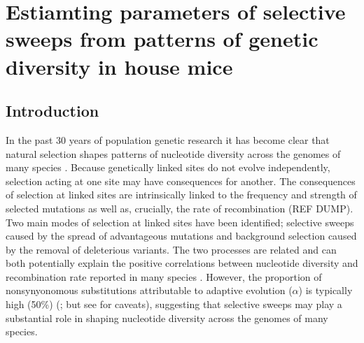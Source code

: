 \chapter{Estiamting parameters of selective sweeps from patterns of genetic diversity in house mice}



%
%

\section*{Introduction}

In the past 30 years of population genetic research it has become clear that natural selection shapes patterns of nucleotide diversity across the genomes of many species \citep{RN154, RN117}. Because genetically linked sites do not evolve independently, selection acting at one site may have consequences for another. The consequences of selection at linked sites are intrinsically linked to the frequency and strength of selected mutations as well as, crucially, the rate of recombination (REF DUMP). Two main modes of selection at linked sites have been identified; selective sweeps caused by the spread of advantageous mutations and background selection caused by the removal of deleterious variants. The two processes are related and can both potentially explain the positive correlations between nucleotide diversity and recombination rate reported in many species \citep{RN117}. However, the proportion of nonsynyonomous substitutions attributable to adaptive evolution ($\alpha$) is typically high (50\%) (\citealt{RN215}; but see \citealt{RN352} for caveats), suggesting that selective sweeps may play a substantial role in shaping nucleotide diversity across the genomes of many species.

